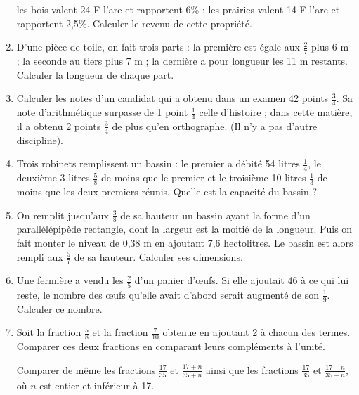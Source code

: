 \begin{enumerate}
les bois valent 24 F l'are et rapportent 6\% ; 
les prairies valent 14 F l'are et rapportent 2,5\%. 
Calculer le revenu de cette propriété.
\item D'une pièce de toile, on fait trois parts : la première est égale aux $\frac27$ plus 6 m ; la seconde
au tiers plus 7 m ; la dernière a pour longueur les 11 m restants. Calculer la longueur de chaque part. 
\item Calculer les notes d'un candidat qui a obtenu 
dans un examen 42 points $\frac34$. Sa note d'arithmétique surpasse de 1 point $\frac14$ celle d'histoire ; dans cette matière, il a obtenu 2 points $\frac34$ de plus qu'en orthographe. (Il n'y a pas d'autre discipline). 
\item Trois robinets remplissent un bassin : le premier a débité 54 litres $\frac14$, le deuxième 3 litres $\frac58$ de moins que le premier et le troisième 10 litres $\frac13$ de moins que les deux premiers réunis. Quelle est la capacité du bassin ? 
\item On remplit jusqu'aux $\frac38$ de sa hauteur un bassin ayant la forme d'un parallélépipède rectangle, dont la largeur est la moitié de la longueur. Puis on fait monter le niveau de 0,38 m en ajoutant 7,6 hectolitres. Le bassin est alors rempli aux $\frac57$ de sa hauteur. Calculer ses dimensions. 
\item Une fermière a vendu les $\frac25$ d'un panier d'œufs. Si elle ajoutait 46 à ce qui lui reste, le nombre des œufs qu'elle avait d'abord serait augmenté de son $\frac19$. Calculer ce nombre.
\item Soit la fraction $\frac58$ et la fraction $\frac7{10}$ obtenue en ajoutant 2 à chacun des termes. Comparer ces deux fractions en comparant leurs 
compléments à l'unité. 

Comparer de même les fractions $\frac{17}{35}$ et $\frac{17+n}{35+n}$ ainsi que les fractions $\frac{17}{35}$ et $\frac{17-n}{35-n}$, où $n$ est entier et inférieur à 17. 

\end{enumerate}